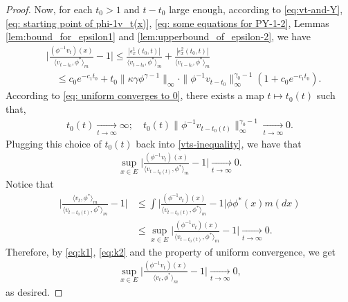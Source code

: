 \documentclass[12pt,a4paper]{amsart}
\theoremstyle{definition}
\numberwithin{equation}{section}
\begin{document}
\begin{proof}
Now, for each $t_0 > 1$ and $t-t_0$ large enough, according to
\eqref{eq:vt-and-Y},  \eqref{eq: starting point of phi-1v_t(x)}, \eqref{eq: some equations for PY-1-2},
Lemmas \ref{lem:bound_for_epsilon1} and \ref{lem:upperbound_of_epsilon-2}, we have
\begin{align} \label{vts-inequality}
	&\Big|\frac{(\phi^{-1}v_t)(x)}{\langle v_{t-t_0},\phi^* \rangle_m}-1 \Big|
   \leq \frac{|\epsilon_x^1(t_0,t)|}{\langle v_{t-t_0},\phi^* \rangle_m} + \frac{|\epsilon_x^2(t_0,t)|}{\langle v_{t-t_0},\phi^* \rangle_m}\\
     & \quad \leq c_0e^{-c_1 t_0} +t_0\|\kappa\gamma\phi^{\gamma - 1}\|_{\infty}
       \cdot \|\phi^{-1}v_{t-t_0}\|^{\gamma_0-1}_\infty (1+c_0 e^{-c_1 t_0}).
\end{align}
According to \eqref{eq: uniform converges to 0}, there exists a map $t\mapsto t_0(t)$ such that,
\begin{align}
	t_0(t)
	\xrightarrow[t\to\infty]{} \infty;
	\quad t_0(t)\| \phi^{-1}v_{t-t_0(t)}\|^{\gamma_0 - 1}_\infty
	\xrightarrow[t\to\infty]{} 0.
\end{align}
Plugging this choice of $t_0(t)$ back into \eqref{vts-inequality}, we have that
\begin{align}\label{eq:k1}
	\sup_{x\in E}\Big|\frac{(\phi^{-1}v_t)(x)}{\langle v_{t-t_0(t)},\phi^* \rangle_m}-1 \Big|
	\xrightarrow[t\to\infty]{} 0.
\end{align}
Notice that
\begin{align}\label{eq:k2}
	\Big |\frac {\langle v_t, \phi^*\rangle_m} {\langle v_{t-t_0(t)} , \phi^*\rangle_m} - 1 \Big |
      & \leq \int \Big | \frac{(\phi^{-1}v_t)(x)}{\langle v_{t-t_0(t)} , \phi^*\rangle_m} - 1 \Big| \phi \phi^*(x) m(dx)\\
    & \leq \sup_{x\in E}\Big|\frac{(\phi^{-1}v_t)(x)}{\langle v_{t-t_0(t)},\phi^* \rangle_m}-1 \Big|
      \xrightarrow[t\to\infty]{} 0.
\end{align}
Therefore, by \eqref{eq:k1}, \eqref{eq:k2} and the property of uniform convergence, we get
\begin{align}
	\sup_{x\in E}\Big|\frac{(\phi^{-1}v_t)(x)}{\langle v_{t},\phi^* \rangle_m}-1 \Big|
	\xrightarrow[t\to\infty]{} 0,
\end{align}
as desired.
\end{proof}
\end{document}
